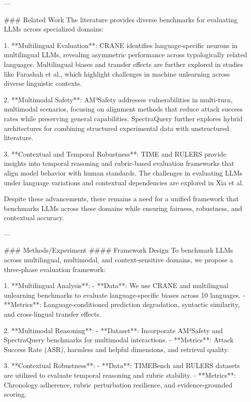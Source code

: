 ---

### Related Work  
The literature provides diverse benchmarks for evaluating LLMs across specialized domains:

1. **Multilingual Evaluation**: CRANE identifies language-specific neurons in multilingual LLMs, revealing asymmetric performance across typologically related languages. Multilingual biases and transfer effects are further explored in studies like Farashah et al., which highlight challenges in machine unlearning across diverse linguistic contexts.  
   
2. **Multimodal Safety**: AM³Safety addresses vulnerabilities in multi-turn, multimodal scenarios, focusing on alignment methods that reduce attack success rates while preserving general capabilities. SpectraQuery further explores hybrid architectures for combining structured experimental data with unstructured literature.  

3. **Contextual and Temporal Robustness**: TIME and RULERS provide insights into temporal reasoning and rubric-based evaluation frameworks that align model behavior with human standards. The challenges in evaluating LLMs under language variations and contextual dependencies are explored in Xia et al.

Despite these advancements, there remains a need for a unified framework that benchmarks LLMs across these domains while ensuring fairness, robustness, and contextual accuracy.

---

### Methods/Experiment  
#### Framework Design  
To benchmark LLMs across multilingual, multimodal, and context-sensitive domains, we propose a three-phase evaluation framework:  

1. **Multilingual Analysis**:
   - **Data**: We use CRANE and multilingual unlearning benchmarks to evaluate language-specific biases across 10 languages.  
   - **Metrics**: Language-conditioned prediction degradation, syntactic similarity, and cross-lingual transfer effects.  

2. **Multimodal Reasoning**:
   - **Dataset**: Incorporate AM³Safety and SpectraQuery benchmarks for multimodal interactions.  
   - **Metrics**: Attack Success Rate (ASR), harmless and helpful dimensions, and retrieval quality.  

3. **Contextual Robustness**:
   - **Data**: TIMEBench and RULERS datasets are utilized to evaluate temporal reasoning and rubric stability.  
   - **Metrics**: Chronology adherence, rubric perturbation resilience, and evidence-grounded scoring.  

